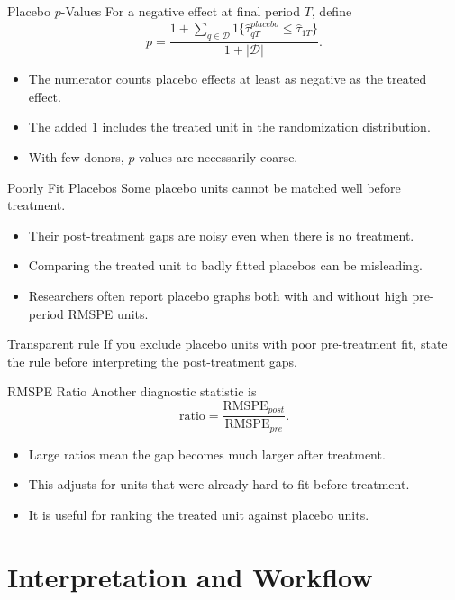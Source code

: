 \documentclass[11pt,aspectratio=169]{beamer}
\newcommand{\RMSPE}{\mathrm{RMSPE}}
\newcommand{\derivbutton}[1]{\vspace{0.4em}\hfill\hyperlink{app:#1}{\beamerbutton{Appendix details}}}
\begin{document}
\begin{frame}{Placebo \(p\)-Values}
  For a negative effect at final period \(T\), define
  \[
    p
    =
    \frac{
      1+\sum_{q\in\mathcal{D}}
      1\{\widehat{\tau}_{qT}^{placebo}\leq \widehat{\tau}_{1T}\}
    }{
      1+|\mathcal{D}|
    }.
  \]
  \begin{itemize}
    \item The numerator counts placebo effects at least as negative as the treated effect.
    \item The added \(1\) includes the treated unit in the randomization distribution.
    \item With few donors, \(p\)-values are necessarily coarse.
  \end{itemize}
  \derivbutton{placebo}
\end{frame}

\begin{frame}{Poorly Fit Placebos}
  Some placebo units cannot be matched well before treatment.
  \begin{itemize}
    \item Their post-treatment gaps are noisy even when there is no treatment.
    \item Comparing the treated unit to badly fitted placebos can be misleading.
    \item Researchers often report placebo graphs both with and without high pre-period RMSPE units.
  \end{itemize}
  \begin{block}{Transparent rule}
    If you exclude placebo units with poor pre-treatment fit, state the rule before interpreting the post-treatment gaps.
  \end{block}
\end{frame}

\begin{frame}{RMSPE Ratio}
  Another diagnostic statistic is
  \[
    \text{ratio}
    =
    \frac{\RMSPE_{post}}{\RMSPE_{pre}}.
  \]
  \begin{itemize}
    \item Large ratios mean the gap becomes much larger after treatment.
    \item This adjusts for units that were already hard to fit before treatment.
    \item It is useful for ranking the treated unit against placebo units.
  \end{itemize}
\end{frame}

\section{Interpretation and Workflow}
\end{document}

